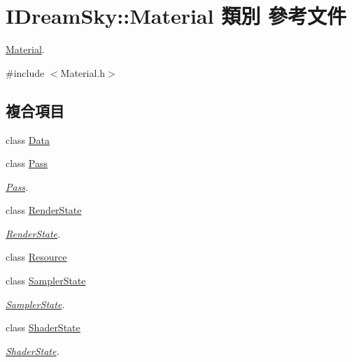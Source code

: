 \hypertarget{class_i_dream_sky_1_1_material}{}\section{I\+Dream\+Sky\+:\+:Material 類別 參考文件}
\label{class_i_dream_sky_1_1_material}


\hyperlink{class_i_dream_sky_1_1_material}{Material}.  




{\ttfamily \#include $<$Material.\+h$>$}

\subsection*{複合項目}
\begin{DoxyCompactItemize}
\item 
class \hyperlink{class_i_dream_sky_1_1_material_1_1_data}{Data}
\item 
class \hyperlink{class_i_dream_sky_1_1_material_1_1_pass}{Pass}
\begin{DoxyCompactList}\small\item\em \hyperlink{class_i_dream_sky_1_1_material_1_1_pass}{Pass}. \end{DoxyCompactList}\item 
class \hyperlink{class_i_dream_sky_1_1_material_1_1_render_state}{Render\+State}
\begin{DoxyCompactList}\small\item\em \hyperlink{class_i_dream_sky_1_1_material_1_1_render_state}{Render\+State}. \end{DoxyCompactList}\item 
class \hyperlink{class_i_dream_sky_1_1_material_1_1_resource}{Resource}
\item 
class \hyperlink{class_i_dream_sky_1_1_material_1_1_sampler_state}{Sampler\+State}
\begin{DoxyCompactList}\small\item\em \hyperlink{class_i_dream_sky_1_1_material_1_1_sampler_state}{Sampler\+State}. \end{DoxyCompactList}\item 
class \hyperlink{class_i_dream_sky_1_1_material_1_1_shader_state}{Shader\+State}
\begin{DoxyCompactList}\small\item\em \hyperlink{class_i_dream_sky_1_1_material_1_1_shader_state}{Shader\+State}. \end{DoxyCompactList}\item 

\end{DoxyCompactItemize}
